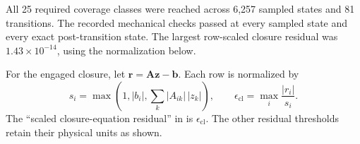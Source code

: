 \documentclass[11pt]{report}
\numberwithin{equation}{section}
\newcommand{\vect}[1]{\bm{#1}}
\begin{document}
All 25 required coverage classes were reached across 6,257 sampled states
and 81 transitions. The recorded mechanical checks passed at every sampled
state and every exact post-transition state. The largest row-scaled closure
residual was $1.43\times10^{-14}$, using the normalization below.

For the engaged closure, let
\(
\vect r=\vect A\vect z-\vect b
\).
Each row is normalized by
\begin{equation}
s_i
=
\max\!\left(
1,
|b_i|,
\sum_k |A_{ik}|\,|z_k|
\right),
\qquad
\epsilon_{\mathrm{cl}}
=
\max_i\frac{|r_i|}{s_i}.
\label{eq:invariants_scaled_closure_residual}
\end{equation}
The ``scaled closure-equation residual'' in
 is \(\epsilon_{\mathrm{cl}}\). The other
residual thresholds retain their physical units as shown.
\end{document}
